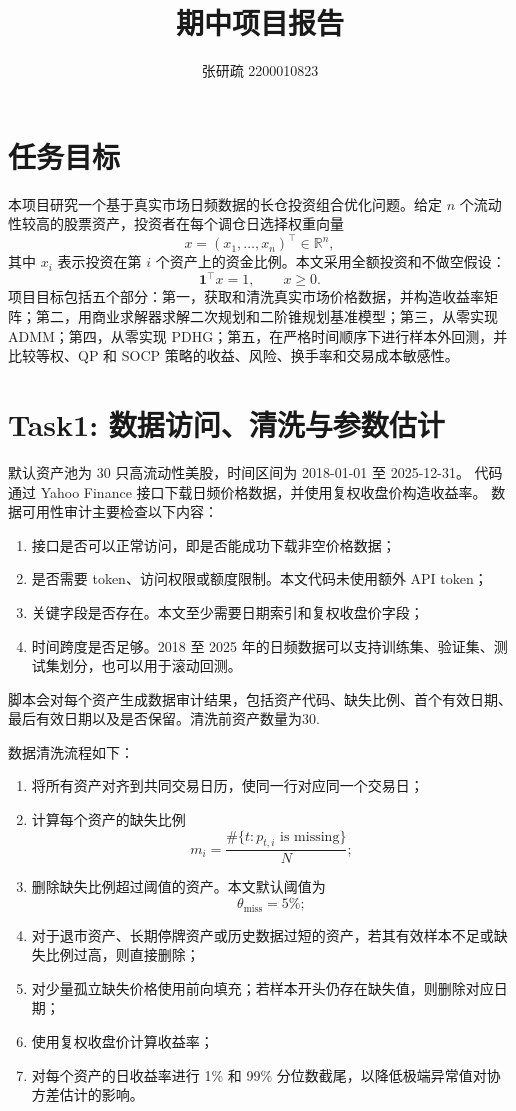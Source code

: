 \documentclass[UTF8,12pt]{ctexart}
\title{期中项目报告}
\author{张研疏 2200010823}
\date{}
\begin{document}
\maketitle

\section{任务目标}

本项目研究一个基于真实市场日频数据的长仓投资组合优化问题。给定 $n$ 个流动性较高的股票资产，投资者在每个调仓日选择权重向量
\[
    x=(x_1,\ldots,x_n)^\top\in\mathbb{R}^n,
\]
其中 $x_i$ 表示投资在第 $i$ 个资产上的资金比例。本文采用全额投资和不做空假设：
\[
    \mathbf{1}^\top x=1,\qquad x\ge 0.
\]
项目目标包括五个部分：第一，获取和清洗真实市场价格数据，并构造收益率矩阵；第二，用商业求解器求解二次规划和二阶锥规划基准模型；第三，从零实现 ADMM；第四，从零实现 PDHG；第五，在严格时间顺序下进行样本外回测，并比较等权、QP 和 SOCP 策略的收益、风险、换手率和交易成本敏感性。

\section{Task1: 数据访问、清洗与参数估计}

默认资产池为 30 只高流动性美股，时间区间为 2018-01-01 至 2025-12-31。
代码通过 Yahoo Finance 接口下载日频价格数据，并使用复权收盘价构造收益率。
数据可用性审计主要检查以下内容：
\begin{enumerate}
    \item 接口是否可以正常访问，即是否能成功下载非空价格数据；
    \item 是否需要 token、访问权限或额度限制。本文代码未使用额外 API token；
    \item 关键字段是否存在。本文至少需要日期索引和复权收盘价字段；
    \item 时间跨度是否足够。2018 至 2025 年的日频数据可以支持训练集、验证集、测试集划分，也可以用于滚动回测。
\end{enumerate}

脚本会对每个资产生成数据审计结果，包括资产代码、缺失比例、首个有效日期、最后有效日期以及是否保留。清洗前资产数量为30.

数据清洗流程如下：
\begin{enumerate}
    \item 将所有资产对齐到共同交易日历，使同一行对应同一个交易日；
    \item 计算每个资产的缺失比例
    \[
        m_i=
        \frac{\#\{t:p_{t,i}\text{ is missing}\}}{N};
    \]
    \item 删除缺失比例超过阈值的资产。本文默认阈值为
    \[
        \theta_{\mathrm{miss}}=5\%;
    \]
    \item 对于退市资产、长期停牌资产或历史数据过短的资产，若其有效样本不足或缺失比例过高，则直接删除；
    \item 对少量孤立缺失价格使用前向填充；若样本开头仍存在缺失值，则删除对应日期；
    \item 使用复权收盘价计算收益率；
    \item 对每个资产的日收益率进行 1\% 和 99\% 分位数截尾，以降低极端异常值对协方差估计的影响。
\end{enumerate}
\end{document}
